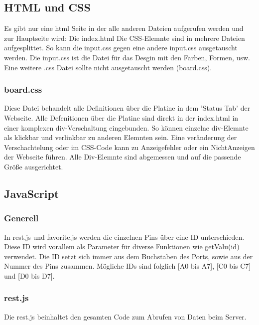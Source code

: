 \subsection{HTML und CSS}
Es gibt nur eine html Seite in der alle anderen Dateien aufgerufen werden und zur
Hauptseite wird: Die index.html\newline
Die CSS-Elemnte sind in mehrere Dateien aufgesplittet. So kann die input.css
gegen eine andere input.css ausgetauscht werden. Die input.css ist die Datei für
das Desgin mit den Farben, Formen, usw.\newline
Eine weitere .css Datei sollte nicht ausgetauscht werden (board.css).

\subsubsection{board.css}
Diese Datei behandelt alle Definitionen über die Platine in dem 'Status
Tab' der Webseite. Alle Defenitionen über die Platine sind direkt in der
index.html in einer komplexen div-Verschaltung eingebunden. So können einzelne
div-Elemnte als klickbar und verlinkbar zu anderen Elemnten sein. Eine
veränderung der Verschachtelung oder im CSS-Code kann zu Anzeigefehler oder ein
NichtAnzeigen der Webseite führen.\newline
Alle Div-Elemnte sind abgemessen und auf die passende Größe ausgerichtet. 

\subsection{JavaScript}
\subsubsection{Generell}
In \textrm{rest.js} und \textrm{favorite.js} werden die einzelnen Pins über eine
ID unterschieden. Diese ID wird vorallem als Parameter für diverse Funktionen wie
\textrm{getValu(id)} verwendet. Die ID setzt sich immer aus dem Buchstaben des
Ports, sowie aus der Nummer des Pins zusammen. Mögliche IDs sind folglich [A0
bis A7], [C0 bis C7] und [D0 bis D7].

\subsubsection{rest.js}
Die \textrm{rest.js} beinhaltet den gesamten Code zum Abrufen von Daten beim
Server.

